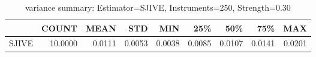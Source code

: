 \begin{table}[ht]
\centering
\caption{variance summary: Estimator=SJIVE, Instruments=250, Strength=0.30}
\begin{tabular}{lrrrrrrrr}
\toprule
 & COUNT & MEAN & STD & MIN & 25\% & 50\% & 75\% & MAX \\
\midrule
SJIVE & 10.0000 & 0.0111 & 0.0053 & 0.0038 & 0.0085 & 0.0107 & 0.0141 & 0.0201 \\
\bottomrule
\end{tabular}
\end{table}
